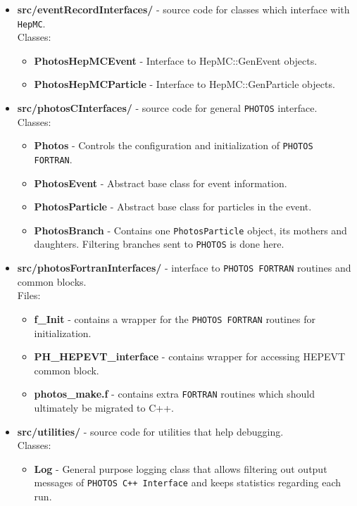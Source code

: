 \documentclass[]{Photos_interface_design}
\begin{document}
\begin{itemize}
\item {\bf src/eventRecordInterfaces/ } - source code for classes which interface with {\tt HepMC}.\\
  Classes:
  \begin{itemize}S
  \item { \bf PhotosHepMCEvent} - Interface to HepMC::GenEvent objects. 
  \item { \bf PhotosHepMCParticle} - Interface to HepMC::GenParticle objects. 
  \end{itemize}   

\item {\bf src/photosCInterfaces/ } - source code for general {\tt PHOTOS} interface.  \\
  Classes:
  \begin{itemize}
  \item { \bf Photos } - Controls the configuration and initialization of {\tt PHOTOS FORTRAN}.
  \item { \bf PhotosEvent } - Abstract base class for event information.
  \item { \bf PhotosParticle } - Abstract base class for particles in the event.
  \item { \bf PhotosBranch } - Contains one {\tt PhotosParticle} object, its mothers and daughters.
  Filtering branches sent to {\tt PHOTOS} is done here.
  \end{itemize}

\item {\bf src/photosFortranInterfaces/ } -  interface to {\tt PHOTOS FORTRAN} routines and common blocks. \\
  Files:
    \begin{itemize}
    \item { \bf f\_Init } - contains a wrapper for the {\tt PHOTOS FORTRAN} routines for initialization.
    \item { \bf PH\_HEPEVT\_interface } - contains wrapper for accessing HEPEVT common block.
    \item { \bf photos\_make.f } - contains extra {\tt FORTRAN} routines which should ultimately be migrated to C++.
    \end{itemize}

\item {\bf src/utilities/ } - source code for utilities that help debugging.\\
  Classes:
  \begin{itemize}
  \item { \bf Log} - General purpose logging class that allows filtering out output messages 
      of {\tt PHOTOS C++ Interface} and keeps statistics regarding each run.
  \end{itemize}   


\end{itemize}
\end{document}
